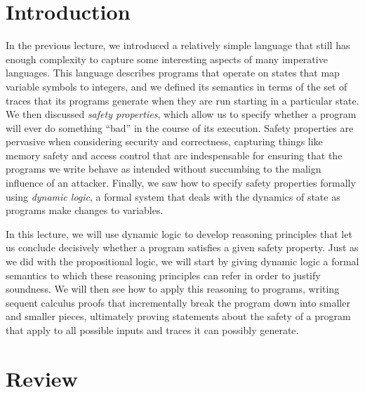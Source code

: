 \documentclass[11pt,twoside]{scrartcl}
\begin{document}
\newcommand{\atrace}{\sigma}%
\newcommand{\stdI}{\dTLint[state=\omega]}%
\newcommand{\Ip}{\dTLint[trace=\atrace]}%
\newcommand{\ws}{\omega}\newcommand{\wt}{\nu}%
\newcommand{\iac}[2][]{\ensuremath{\llbracket #1 \rrbracket}}

\maketitle
\thispagestyle{empty}


\section{Introduction}

In the previous lecture, we introduced a relatively simple language that still has enough complexity to capture some interesting aspects of many imperative languages.
This language describes programs that operate on states that map variable symbols to integers, and we defined its semantics in terms of the set of traces that its programs generate when they are run starting in a particular state.
We then discussed \emph{safety properties}, which allow us to specify whether a program will ever do something ``bad'' in the course of its execution.
Safety properties are pervasive when considering security and correctness, capturing things like memory safety and access control that are indespensable for ensuring that the programs we write behave as intended without succumbing to the malign influence of an attacker.
Finally, we saw how to specify safety properties formally using \emph{dynamic logic}, a formal system that deals with the dynamics of state as programs make changes to variables.

In this lecture, we will use dynamic logic to develop reasoning principles that let us conclude decisively whether a program satisfies a given safety property.
Just as we did with the propositional logic, we will start by giving dynamic logic a formal semantics to which these reasoning principles can refer in order to justify soundness.
We will then see how to apply this reasoning to programs, writing sequent calculus proofs that incrementally break the program down into smaller and smaller pieces, ultimately proving statements about the safety of a program that apply to all possible inputs and traces it can possibly generate.

\section{Review}
\end{document}
